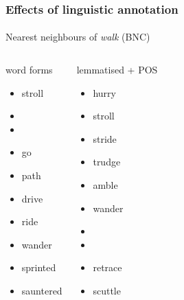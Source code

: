 \documentclass[t]{beamer} %
\begin{document}
\begin{frame}
  \frametitle{Effects of linguistic annotation}
  \framesubtitle{}

  \centering
  Nearest neighbours of \emph{walk} (BNC)
  \ungap\footnotesize
  \begin{columns}[t]
    \column{4cm}
    \begin{block}{word forms}
      \begin{itemize}
      \item stroll
      \item {}
      \item {}
      \item go
      \item path
      \item drive
      \item ride
      \item wander
      \item sprinted
      \item sauntered
      \end{itemize}
    \end{block}
    \column{4cm}
    \begin{block}{lemmatised + POS}
      \begin{itemize}
      \item hurry
      \item stroll
      \item stride
      \item trudge
      \item amble
      \item wander
      \item {} 
      \item {}
      \item retrace
      \item scuttle 
      \end{itemize}
    \end{block}
  \end{columns}

  \hfill{}
\end{frame}
\end{document}
